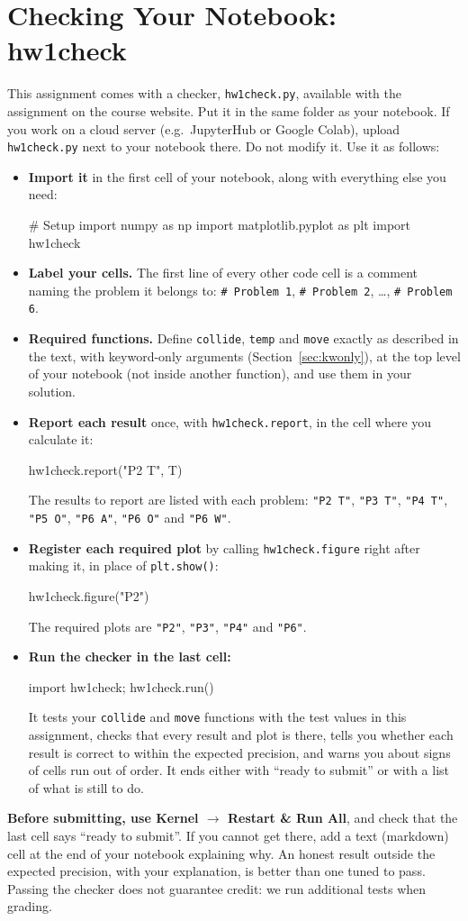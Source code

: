 \documentclass[12pt]{article}
\begin{document}
\section{Checking Your Notebook: hw1check}

\noindent
This assignment comes with a checker, {\tt hw1check.py}, available with the assignment on the
course website.  Put it in the same folder as your notebook.  If you work on a cloud server
(e.g.\ JupyterHub or Google Colab), upload {\tt hw1check.py} next to your notebook there.  Do not
modify it.  Use it as follows:
\begin{itemize}
\item {\bf Import it} in the first cell of your notebook, along with everything else you need:
\begin{python}
# Setup
import numpy as np
import matplotlib.pyplot as plt
import hw1check
\end{python}
\item {\bf Label your cells.}  The first line of every other code cell is a comment naming the
  problem it belongs to: {\tt \# Problem 1}, {\tt \# Problem 2}, \ldots, {\tt \# Problem 6}.
\item {\bf Required functions.}  Define {\tt collide}, {\tt temp} and {\tt move} exactly as described in the
  text, with keyword-only arguments (Section~\ref{sec:kwonly}), at the top level of your notebook (not
  inside another function), and use them in your solution.
\item {\bf Report each result} once, with {\tt hw1check.report}, in the cell where you calculate it:
\begin{python}
hw1check.report("P2 T", T)
\end{python}
  The results to report are listed with each problem: {\tt "P2 T"}, {\tt "P3 T"}, {\tt "P4 T"},
  {\tt "P5 O"}, {\tt "P6 A"}, {\tt "P6 O"} and {\tt "P6 W"}.
\item {\bf Register each required plot} by calling {\tt hw1check.figure} right after making it, in
  place of {\tt plt.show()}:
\begin{python}
hw1check.figure("P2")
\end{python}
  The required plots are {\tt "P2"}, {\tt "P3"}, {\tt "P4"} and {\tt "P6"}.
\item {\bf Run the checker in the last cell:}
\begin{python}
import hw1check; hw1check.run()
\end{python}
  It tests your {\tt collide} and {\tt move} functions with the test values in this assignment,
  checks that every result and plot is there, tells you whether each result is correct to within
  the expected precision, and warns you about signs of cells run out of order.  It ends either
  with ``ready to submit'' or with a list of what is still to do.
\end{itemize}
{\bf Before submitting, use Kernel $\rightarrow$ Restart \& Run All}, and check that the last cell
says ``ready to submit''.  If you cannot get there, add a text (markdown) cell at the end of your
notebook explaining why.  An honest result outside the expected precision, with your explanation,
is better than one tuned to pass.  Passing the checker does not guarantee credit: we run
additional tests when grading.
\end{document}

